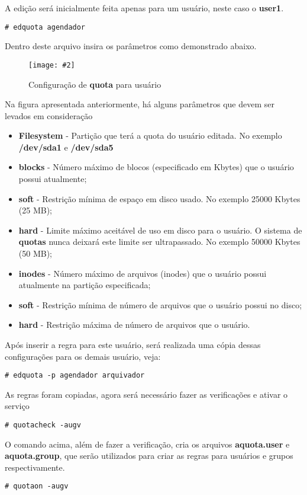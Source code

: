 \documentclass[
	12pt,				%
	openany,			%
	a4paper,			%
	chapter=TITLE,		%
	section=TITLE,		%
	english,
	brazil				%
]{abntex2}
\newcommand{\includeImage}[3] {

\begin{figure}[H]
 	 \centering
  		\texttt{[image: \#2]}
  	\caption{#3}
\end{figure}

}
\begin{document}
A edição será inicialmente feita apenas para um usuário, neste caso o \textbf{user1}.
\begin{lstlisting}
# edquota agendador
\end{lstlisting}

Dentro deste arquivo insira os parâmetros como demonstrado abaixo.
\includeImage{0.5}{imgs/3_configuracao_quota/2.png}{Configuração de \textbf{quota} para usuário}

Na figura apresentada anteriormente, há alguns parâmetros que devem ser levados em consideração

\begin{itemize}
	\item \textbf{Filesystem} - Partição que terá a quota do usuário editada. No exemplo \textbf{/dev/sda1} e \textbf{/dev/sda5}
    \item \textbf{blocks} - Número máximo de blocos (especificado em Kbytes) que o usuário possui atualmente;
    \item \textbf{soft} - Restrição mínima de espaço em disco usado. No exemplo 25000 Kbytes (25 MB);
    \item \textbf{hard} - Limite máximo aceitável de uso em disco para o usuário. O sistema de \textbf{quotas} nunca deixará este limite ser ultrapassado. No exemplo 50000 Kbytes (50 MB);
    \item \textbf{inodes} - Número máximo de arquivos (inodes) que o usuário possui atualmente na partição especificada;
    \item \textbf{soft} - Restrição mínima de número de arquivos que o usuário possui no disco;
    \item \textbf{hard} - Restrição máxima de número de arquivos que o usuário.
\end{itemize}

Após inserir a regra para este usuário, será realizada uma cópia dessas configurações para os demais usuário, veja:

\begin{lstlisting}
# edquota -p agendador arquivador
\end{lstlisting}

As regras foram copiadas, agora será necessário fazer as verificações e ativar o serviço

\begin{lstlisting}
# quotacheck -augv
\end{lstlisting}

O comando acima, além de fazer a verificação, cria os arquivos \textbf{aquota.user} e \textbf{aquota.group}, que serão utilizados para criar as regras para usuários e grupos respectivamente.
\begin{lstlisting}
# quotaon -augv
\end{lstlisting}
\end{document}
